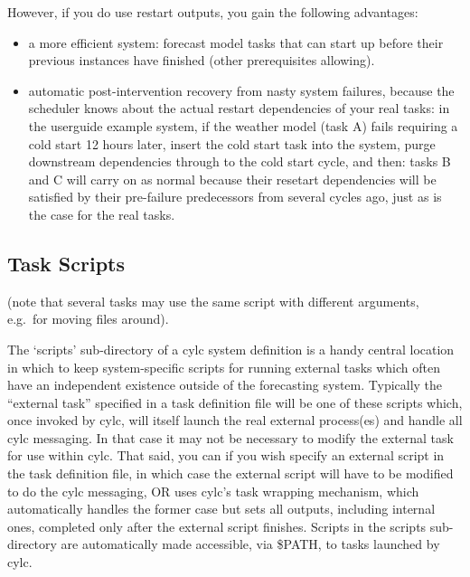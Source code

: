 \documentclass[11pt,a4paper]{article}
\begin{document}
However, if you do use restart outputs, you gain the following advantages:

\begin{itemize}

    \item a more efficient system: forecast model tasks that can start
        up before their previous instances have finished (other
        prerequisites allowing).  
    
    \item automatic post-intervention recovery from nasty system
        failures, because the scheduler knows about the actual restart
        dependencies of your real tasks: in the userguide example
        system, if the weather model (task A) fails requiring a cold
        start 12 hours later, insert the cold start task into the
        system, purge downstream dependencies through to the cold start
        cycle, and then: tasks B and C will carry on as normal because 
        their resetart dependencies will be satisfied by their
        pre-failure predecessors from several cycles ago, just as is the
        case for the real tasks.

\end{itemize}

\pagebreak
\subsection{Task Scripts}
\label{TaskScripts}

(note that several tasks may use the same script with different
arguments, e.g.\ for moving files around).

The `scripts' sub-directory of a cylc system definition is a handy
central location in which to keep system-specific scripts for running
external tasks which often have an independent existence outside of the
forecasting system. Typically the ``external task'' specified in a task
definition file will be one of these scripts which, once invoked by
cylc, will itself launch the real external process(es) and handle all
cylc messaging. In that case it may not be necessary to modify the
external task for use within cylc.  That said, you can if you wish
specify an external script in the task definition file, in which case 
the external script will have to be modified to do the cylc messaging,
OR uses cylc's task wrapping mechanism, which automatically handles the
former case but sets all outputs, including internal ones, completed
only after the external script finishes.  Scripts in the scripts
sub-directory are automatically made accessible, via \$PATH, to tasks
launched by cylc. 
\end{document}
